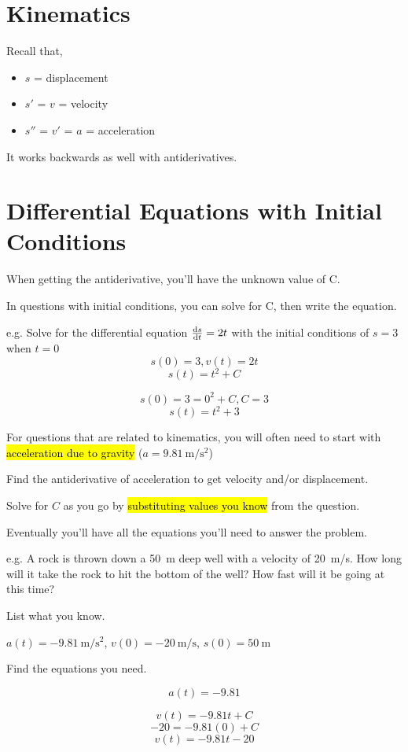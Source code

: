 \documentclass[a4paper,12pt]{article}
\begin{document}
\pagebreak

\section{Kinematics}
Recall that,
\begin{itemize}
    \item{$s$ = displacement}
    \item{$s'$ = $v$ = velocity}
    \item{$s''$ = $v'$ = $a$ = acceleration}
\end{itemize}
It works backwards as well with antiderivatives.

\section{Differential Equations with Initial Conditions}
When getting the antiderivative, you'll have the unknown value of C.

In questions with initial conditions, you can solve for C, then write the equation.

e.g. Solve for the differential equation $\dv{s}{t} = 2t$ with the initial conditions of $s = 3$ when $t = 0$
$$s(0) = 3, v(t) = 2t$$
$$s(t) = t^2 + C$$

$$s(0) = 3 = 0^2 + C, C = 3$$
$$s(t) = t^2 + 3$$

For questions that are related to kinematics, you will often need to start with \hl{acceleration due to gravity} ($a = \SI{9.81}{\m/\s^2}$)

Find the antiderivative of acceleration to get velocity and/or displacement. 

Solve for $C$ as you go by \hl{substituting values you know} from the question.

Eventually you'll have all the equations you'll need to answer the problem.

\pagebreak

e.g. A rock is thrown down a \SI{50}{\m} deep well with a velocity of \SI{20}{\m/\s}. How long will it take the rock to hit the bottom of the well? How fast will it be going at this time?

List what you know.

$a(t) = \SI{-9.81}{\m/\s^2}$, $v(0) = \SI{-20}{\m/\s}$, $s(0) = \SI{50}{\m}$

Find the equations you need.

$$a(t) = -9.81$$

$$v(t) = -9.81t + C$$
$$-20 = -9.81(0) + C$$
$$v(t) = -9.81t - 20$$
\end{document}
